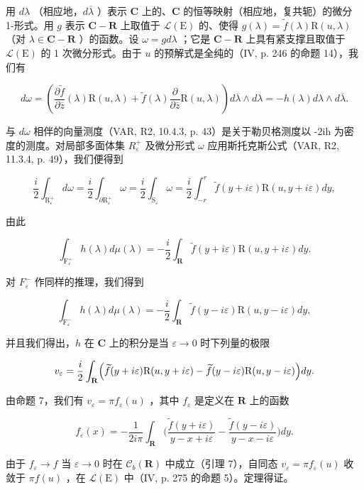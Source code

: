 用 \(d\lambda\) （相应地，\(d\overline{\lambda}\) ）表示 \(\mathbf{C}\) 上的、\(\mathbf{C}\) 的恒等映射（相应地，复共轭）的微分 1-形式。用 \(g\) 表示 \(\mathbf{C} - \mathbf{R}\) 上取值于 \(\mathcal{L}(\mathrm{E})\) 的、使得 \(g(\lambda) = \widetilde{f}(\lambda)\mathrm{R}(u,\lambda)\) （对 \(\lambda \in \mathbf{C} - \mathbf{R}\) ）的函数。设 \(\omega = g d\lambda\) ；它是 \(\mathbf{C} - \mathbf{R}\) 上具有紧支撑且取值于 \(\mathcal{L}(\mathrm{E})\) 的 1 次微分形式。由于 \(u\) 的预解式是全纯的（IV, p. 246 的命题 14），我们有

\[
d \omega = \left(\frac {\partial \widetilde {f}}{\partial \overline {{z}}} (\lambda) \mathrm{R} (u, \lambda) + \widetilde {f} (\lambda) \frac {\partial}{\partial \overline {{z}}} \mathrm{R} (u, \lambda)\right) d \overline {{\lambda}} \wedge d \lambda = - h (\lambda) d \lambda \wedge d \overline {{\lambda}}.
\]

与 \(d\omega\) 相伴的向量测度（VAR, R2, 10.4.3, p. 43）是关于勒贝格测度以 -2ih 为密度的测度。对局部多面体集 \(R_{\varepsilon}^{+}\) 及微分形式 \(\omega\) 应用斯托克斯公式（VAR, R2, 11.3.4, p. 49），我们便得到

\[
\frac {i}{2} \int_ {\mathrm{R} _ {\varepsilon} ^ {+}} d \omega = \frac {i}{2} \int_ {\partial \mathrm{R} _ {\varepsilon} ^ {+}} \omega = \frac {i}{2} \int_ {\mathrm{S} _ {\varepsilon}} \omega = \frac {i}{2} \int_ {- r} ^ {r} \widetilde {f} (y + i \varepsilon) \mathrm{R} (u, y + i \varepsilon) d y,
\]

由此

\[
\int_ {\mathrm{F} _ {\varepsilon} ^ {+}} h (\lambda) d \mu (\lambda) = - \frac {i}{2} \int_ {\mathbf {R}} \widetilde {f} (y + i \varepsilon) \mathrm{R} (u, y + i \varepsilon) d y.
\]

对 \(F_{\varepsilon}^{-}\) 作同样的推理，我们得到

\[
\int_ {\mathrm{F} _ {\varepsilon} ^ {-}} h (\lambda) d \mu (\lambda) = - \frac {i}{2} \int_ {\mathbf {R}} \widetilde {f} (y - i \varepsilon) \mathrm{R} (u, y - i \varepsilon) d y,
\]

并且我们得出，\(h\) 在 \(\mathbf{C}\) 上的积分是当 \(\varepsilon\to0\) 时下列量的极限

\[
v _ {\varepsilon} = \frac {i}{2} \int_ {\mathbf {R}} \Bigl (\widetilde {f} (y + i \varepsilon) \mathrm{R} (u, y + i \varepsilon) - \widetilde {f} (y - i \varepsilon) \mathrm{R} (u, y - i \varepsilon) \Bigr) d y.
\]

由命题 7，我们有 \(v_{\varepsilon} = \pi f_{\varepsilon}(u)\) ，其中 \(f_{\varepsilon}\) 是定义在 \(\mathbf{R}\) 上的函数

\[
f _ {\varepsilon} (x) = - \frac {1}{2 i \pi} \int_ {\mathbf {R}} \biggl (\frac {\widetilde {f} (y + i \varepsilon)}{y - x + i \varepsilon} - \frac {\widetilde {f} (y - i \varepsilon)}{y - x - i \varepsilon} \biggr) d y.
\]

由于 \(f_{\varepsilon} \to f\) 当 \(\varepsilon \to 0\) 时在 \(\mathcal{C}_{b}(\mathbf{R})\) 中成立（引理 7），自同态 \(v_{\varepsilon} = \pi f_{\varepsilon}(u)\) 收敛于 \(\pi f(u)\) ，在 \(\mathcal{L}(\mathrm{E})\) 中（IV, p. 275 的命题 5）。定理得证。

